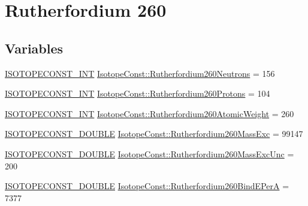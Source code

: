 \hypertarget{group___isotope_const-_rutherfordium-_rf260}{}\section{Rutherfordium 260}
\label{group___isotope_const-_rutherfordium-_rf260}
\subsection*{Variables}
\begin{DoxyCompactItemize}
\item 
\mbox{\hyperlink{group___isotope_const-_macros_ga5f18360b3e99483a35c32d789e62621c}{I\+S\+O\+T\+O\+P\+E\+C\+O\+N\+S\+T\+\_\+\+I\+NT}} \mbox{\hyperlink{group___isotope_const-_rutherfordium-_rf260_gad2b0c86e1f1574f940dc3df41632a0eb}{Isotope\+Const\+::\+Rutherfordium260\+Neutrons}} = 156
\item 
\mbox{\hyperlink{group___isotope_const-_macros_ga5f18360b3e99483a35c32d789e62621c}{I\+S\+O\+T\+O\+P\+E\+C\+O\+N\+S\+T\+\_\+\+I\+NT}} \mbox{\hyperlink{group___isotope_const-_rutherfordium-_rf260_gaec70677eeeabb22951cc3b10d4650ad6}{Isotope\+Const\+::\+Rutherfordium260\+Protons}} = 104
\item 
\mbox{\hyperlink{group___isotope_const-_macros_ga5f18360b3e99483a35c32d789e62621c}{I\+S\+O\+T\+O\+P\+E\+C\+O\+N\+S\+T\+\_\+\+I\+NT}} \mbox{\hyperlink{group___isotope_const-_rutherfordium-_rf260_ga6acfda9b4aa70b3d69b8c2a0c9169112}{Isotope\+Const\+::\+Rutherfordium260\+Atomic\+Weight}} = 260
\item 
\mbox{\hyperlink{group___isotope_const-_macros_ga8f45a7272ce02c0b4c65c44636ed719a}{I\+S\+O\+T\+O\+P\+E\+C\+O\+N\+S\+T\+\_\+\+D\+O\+U\+B\+LE}} \mbox{\hyperlink{group___isotope_const-_rutherfordium-_rf260_ga88239c756b0bcefc4741c3175202dc76}{Isotope\+Const\+::\+Rutherfordium260\+Mass\+Exc}} = 99147
\item 
\mbox{\hyperlink{group___isotope_const-_macros_ga8f45a7272ce02c0b4c65c44636ed719a}{I\+S\+O\+T\+O\+P\+E\+C\+O\+N\+S\+T\+\_\+\+D\+O\+U\+B\+LE}} \mbox{\hyperlink{group___isotope_const-_rutherfordium-_rf260_gaad615c85c459358c14d177f6dfb2845e}{Isotope\+Const\+::\+Rutherfordium260\+Mass\+Exc\+Unc}} = 200
\item 
\mbox{\hyperlink{group___isotope_const-_macros_ga8f45a7272ce02c0b4c65c44636ed719a}{I\+S\+O\+T\+O\+P\+E\+C\+O\+N\+S\+T\+\_\+\+D\+O\+U\+B\+LE}} \mbox{\hyperlink{group___isotope_const-_rutherfordium-_rf260_ga2e409920ec76d98d62081924235d19e1}{Isotope\+Const\+::\+Rutherfordium260\+Bind\+E\+PerA}} = 7377

\end{DoxyCompactItemize}

